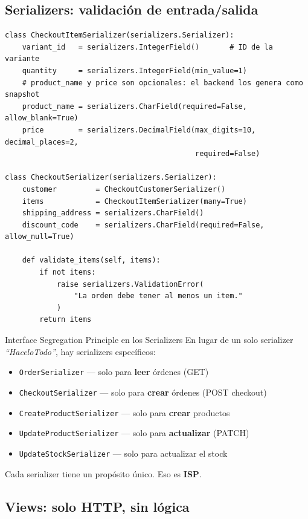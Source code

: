\documentclass[12pt, a4paper]{article}
\begin{document}
\subsection{Serializers: validación de entrada/salida}

\begin{lstlisting}[caption={orders/serializers.py -- CheckoutSerializer (entrada)}]
class CheckoutItemSerializer(serializers.Serializer):
    variant_id   = serializers.IntegerField()       # ID de la variante
    quantity     = serializers.IntegerField(min_value=1)
    # product_name y price son opcionales: el backend los genera como snapshot
    product_name = serializers.CharField(required=False, allow_blank=True)
    price        = serializers.DecimalField(max_digits=10, decimal_places=2,
                                            required=False)

class CheckoutSerializer(serializers.Serializer):
    customer         = CheckoutCustomerSerializer()
    items            = CheckoutItemSerializer(many=True)
    shipping_address = serializers.CharField()
    discount_code    = serializers.CharField(required=False, allow_null=True)

    def validate_items(self, items):
        if not items:
            raise serializers.ValidationError(
                "La orden debe tener al menos un item."
            )
        return items
\end{lstlisting}

\begin{conceptbox}{Interface Segregation Principle en los Serializers}
En lugar de un solo serializer \textit{``HaceloTodo''}, hay serializers específicos:
\begin{itemize}[noitemsep]
  \item \texttt{OrderSerializer} — solo para \textbf{leer} órdenes (GET)
  \item \texttt{CheckoutSerializer} — solo para \textbf{crear} órdenes (POST checkout)
  \item \texttt{CreateProductSerializer} — solo para \textbf{crear} productos
  \item \texttt{UpdateProductSerializer} — solo para \textbf{actualizar} (PATCH)
  \item \texttt{UpdateStockSerializer} — solo para actualizar el stock
\end{itemize}
Cada serializer tiene un propósito único. Eso es \textbf{ISP}.
\end{conceptbox}

\subsection{Views: solo HTTP, sin lógica}
\end{document}

